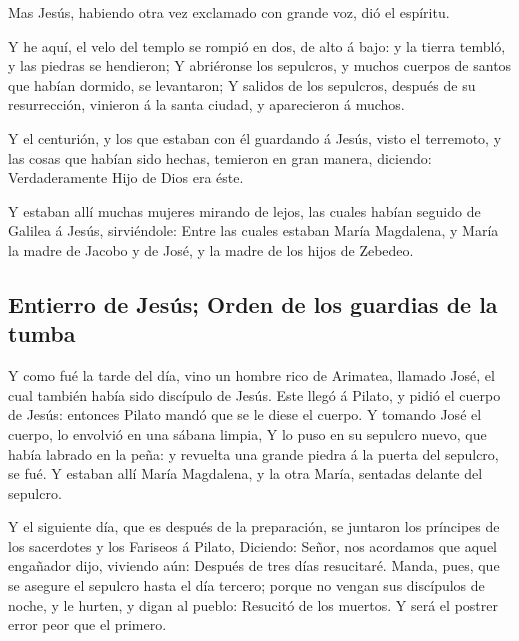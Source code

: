 Mas Jesús, habiendo otra vez exclamado con grande voz,
dió el espíritu.

 Y he aquí, el velo del templo se rompió en dos, de alto
á bajo: y la tierra tembló, y las piedras se hendieron; 
Y abriéronse los sepulcros, y muchos cuerpos de santos que habían
dormido, se levantaron;  Y salidos de los sepulcros,
después de su resurrección, vinieron á la santa ciudad, y aparecieron á
muchos.

 Y el centurión, y los que estaban con él guardando á
Jesús, visto el terremoto, y las cosas que habían sido hechas, temieron
en gran manera, diciendo: Verdaderamente Hijo de Dios era éste.

 Y estaban allí muchas mujeres mirando de lejos, las
cuales habían seguido de Galilea á Jesús, sirviéndole: 
Entre las cuales estaban María Magdalena, y María la madre de Jacobo y
de José, y la madre de los hijos de Zebedeo.

\hypertarget{entierro-de-jesuxfas-orden-de-los-guardias-de-la-tumba}{%
\subsection{Entierro de Jesús; Orden de los guardias de la
tumba}\label{entierro-de-jesuxfas-orden-de-los-guardias-de-la-tumba}}

 Y como fué la tarde del día, vino un hombre rico de
Arimatea, llamado José, el cual también había sido discípulo de Jesús.
 Este llegó á Pilato, y pidió el cuerpo de Jesús:
entonces Pilato mandó que se le diese el cuerpo.  Y
tomando José el cuerpo, lo envolvió en una sábana limpia,
 Y lo puso en su sepulcro nuevo, que había labrado en la
peña: y revuelta una grande piedra á la puerta del sepulcro, se fué.
 Y estaban allí María Magdalena, y la otra María,
sentadas delante del sepulcro.

 Y el siguiente día, que es después de la preparación, se
juntaron los príncipes de los sacerdotes y los Fariseos á Pilato,
 Diciendo: Señor, nos acordamos que aquel engañador dijo,
viviendo aún: Después de tres días resucitaré.  Manda,
pues, que se asegure el sepulcro hasta el día tercero; porque no vengan
sus discípulos de noche, y le hurten, y digan al pueblo: Resucitó de los
muertos. Y será el postrer error peor que el primero.

